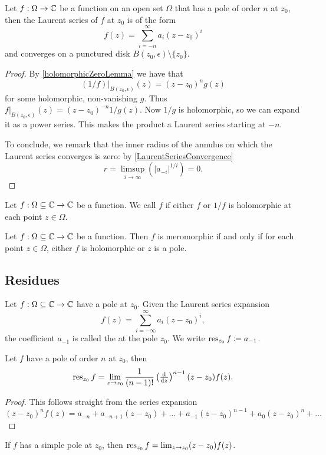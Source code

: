 \begin{proposition}
Let $f:\Omega\to \mathbb{C}$ be a function on an open set $\Omega$ that has a pole of order $n$ at $z_0$, then the Laurent series of $f$ at $z_0$ is of the form
\[  f(z) = \sum_{i=-n}^\infty a_i(z-z_0)^i \]
and converges on a punctured disk $B(z_0, \epsilon)\setminus\{z_0\}$.
\end{proposition}
\begin{proof}
By \ref{holomorphicZeroLemma} we have that 
\[ (1/f)|_{B(z_0,\epsilon)}(z) = (z-z_0)^ng(z) \]
for some holomorphic, non-vanishing $g$. Thus $f|_{B(z_0,\epsilon)}(z) = (z-z_0)^{-n}1/g(z)$. Now $1/g$ is holomorphic, so we can expand it as a power series. This makes the product a Laurent series starting at $-n$.

To conclude, we remark that the inner radius of the annulus on which the Laurent series converges is zero: by \ref{LaurentSeriesConvergence}
\[ r = \limsup_{i\to\infty}\left(|a_{-i}|^{1/i}\right) = 0. \]
\end{proof}

\begin{definition}
Let $f: \Omega\subseteq \mathbb{C} \to \mathbb{C}$ be a function. We call $f$  if either $f$ or $1/f$ is holomorphic at each point $z\in \Omega$.
\end{definition}

\begin{lemma}
Let $f: \Omega\subseteq \mathbb{C} \to \mathbb{C}$ be a function. Then $f$ is meromorphic \textup{if and only if} for each point $z\in \Omega$, either $f$ is holomorphic or $z$ is a pole.
\end{lemma}

\subsection{Residues}
\begin{definition}
Let $f: \Omega\subseteq \mathbb{C} \to \mathbb{C}$ have a pole at $z_0$. Given the Laurent series expansion
\[  f(z) = \sum_{i=-\infty}^\infty a_i(z-z_0)^i, \]
the coefficient $a_{-1}$ is called the  at the pole $z_0$. We write $\operatorname{res}_{z_0}f \coloneqq a_{-1}$.
\end{definition}

\begin{proposition}
Let $f$ have a pole of order $n$ at $z_0$, then
\[ \res_{z_0}f = \lim_{z\to z_0}\frac{1}{(n-1)!}\left(\od{}{z}\right)^{n-1}(z-z_0)f(z). \]
\end{proposition}
\begin{proof}
This follows straight from the series expansion
\[ (z-z_0)^nf(z) = a_{-n} + a_{-n+1}(z-z_0) + \ldots + a_{-1}(z-z_0)^{n-1} + a_0(z-z_0)^n + \ldots \]
\end{proof}
\begin{corollary}
If $f$ has a simple pole at $z_0$, then $\operatorname{res}_{z_0} f = \lim_{z\to z_0}(z-z_0)f(z)$.
\end{corollary}

